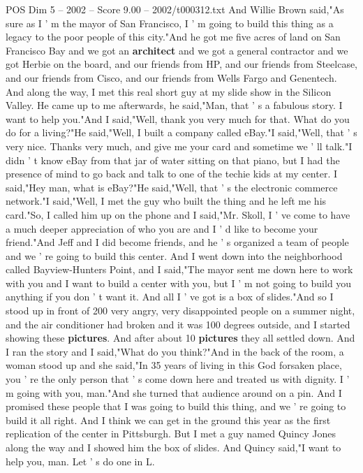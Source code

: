 \begin{textsample}{POS Dim 5 – 2002 – Score 9.00 – 2002/t000312.txt}
And Willie Brown said,"As sure as I ' m the mayor of San Francisco, I ' m going to build this thing as a legacy to the poor people of this city."And he got me five acres of land on San Francisco Bay and we got an \textbf{architect} and we got a general contractor and we got Herbie on the board, and our friends from HP, and our friends from Steelcase, and our friends from Cisco, and our friends from Wells Fargo and Genentech.
And along the way, I met this real short guy at my slide show in the Silicon Valley.
He came up to me afterwards, he said,"Man, that ' s a fabulous story.
I want to help you."And I said,"Well, thank you very much for that.
What do you do for a living?"He said,"Well, I built a company called eBay."I said,"Well, that ' s very nice.
Thanks very much, and give me your card and sometime we ' ll talk."I didn ' t know eBay from that jar of water sitting on that piano, but I had the presence of mind to go back and talk to one of the techie kids at my center.
I said,"Hey man, what is eBay?"He said,"Well, that ' s the electronic commerce network."I said,"Well, I met the guy who built the thing and he left me his card."So, I called him up on the phone and I said,"Mr.
Skoll, I ' ve come to have a much deeper appreciation of who you are and I ' d like to become your friend."And Jeff and I did become friends, and he ' s organized a team of people and we ' re going to build this center.
And I went down into the neighborhood called Bayview-Hunters Point, and I said,"The mayor sent me down here to work with you and I want to build a center with you, but I ' m not going to build you anything if you don ' t want it.
And all I ' ve got is a box of slides."And so I stood up in front of 200 very angry, very disappointed people on a summer night, and the air conditioner had broken and it was 100 degrees outside, and I started showing these \textbf{pictures}.
And after about 10 \textbf{pictures} they all settled down.
And I ran the story and I said,"What do you think?"And in the back of the room, a woman stood up and she said,"In 35 years of living in this God forsaken place, you ' re the only person that ' s come down here and treated us with dignity.
I ' m going with you, man."And she turned that audience around on a pin.
And I promised these people that I was going to build this thing, and we ' re going to build it all right.
And I think we can get in the ground this year as the first replication of the center in Pittsburgh.
But I met a guy named Quincy Jones along the way and I showed him the box of slides.
And Quincy said,"I want to help you, man.
Let ' s do one in L.

\end{textsample}
